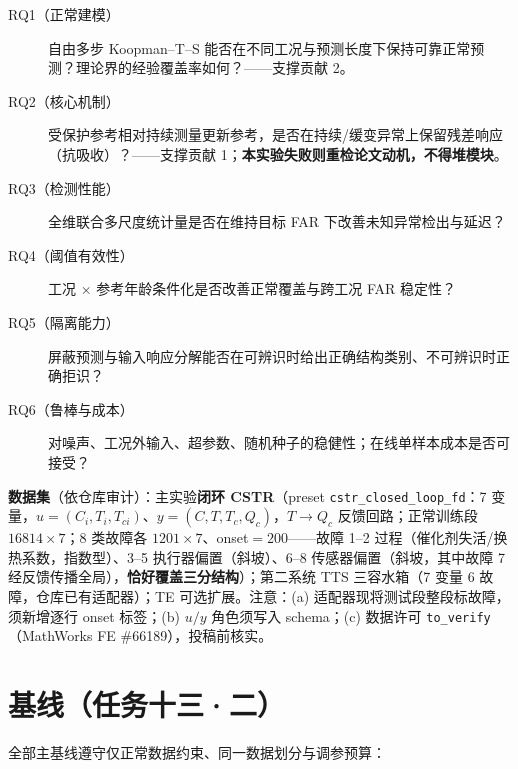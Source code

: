 \documentclass[11pt,a4paper]{ctexart}
\theoremstyle{remark}
\begin{document}
\begin{description}
\item[RQ1（正常建模）] 自由多步 Koopman--T--S 能否在不同工况与预测长度下保持可靠正常预测？理论界的经验覆盖率如何？——支撑贡献 2。
\item[RQ2（核心机制）] 受保护参考相对持续测量更新参考，是否在持续/缓变异常上保留残差响应（抗吸收）？——支撑贡献 1；\textbf{本实验失败则重检论文动机，不得堆模块}。
\item[RQ3（检测性能）] 全维联合多尺度统计量是否在维持目标 FAR 下改善未知异常检出与延迟？
\item[RQ4（阈值有效性）] 工况 × 参考年龄条件化是否改善正常覆盖与跨工况 FAR 稳定性？
\item[RQ5（隔离能力）] 屏蔽预测与输入响应分解能否在可辨识时给出正确结构类别、不可辨识时正确拒识？
\item[RQ6（鲁棒与成本）] 对噪声、工况外输入、超参数、随机种子的稳健性；在线单样本成本是否可接受？
\end{description}

\textbf{数据集}（依仓库审计）：主实验\textbf{闭环 CSTR}（preset \texttt{cstr\_closed\_loop\_fd}：7 变量，$u=(C_i,T_i,T_{ci})$、$y=(C,T,T_c,Q_c)$，$T\!\to\!Q_c$ 反馈回路；正常训练段 $16814\times7$；8 类故障各 $1201\times7$、onset$=200$——故障 1--2 过程（催化剂失活/换热系数，指数型）、3--5 执行器偏置（斜坡）、6--8 传感器偏置（斜坡，其中故障 7 经反馈传播全局），\textbf{恰好覆盖三分结构}）；第二系统 TTS 三容水箱（7 变量 6 故障，仓库已有适配器）；TE 可选扩展。注意：(a) 适配器现将测试段整段标故障，须新增逐行 onset 标签；(b) $u/y$ 角色须写入 schema；(c) 数据许可 \texttt{to\_verify}（MathWorks FE \#66189），投稿前核实。

\section{基线（任务十三·二）}

全部主基线遵守仅正常数据约束、同一数据划分与调参预算：
\end{document}
